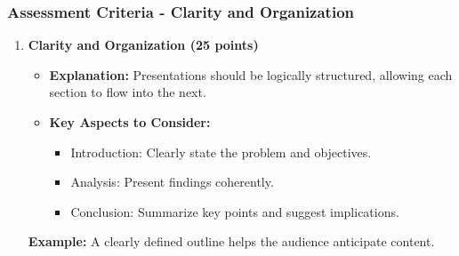\documentclass[aspectratio=169]{beamer}
\begin{document}
\begin{frame}[fragile]
    \frametitle{Assessment Criteria - Clarity and Organization}
    \begin{enumerate}
        \item \textbf{Clarity and Organization (25 points)}
        \begin{itemize}
            \item \textbf{Explanation:} Presentations should be logically structured, allowing each section to flow into the next.
            \item \textbf{Key Aspects to Consider:}
            \begin{itemize}
                \item Introduction: Clearly state the problem and objectives.
                \item Analysis: Present findings coherently.
                \item Conclusion: Summarize key points and suggest implications.
            \end{itemize}
        \end{itemize}
        
        \textbf{Example:} A clearly defined outline helps the audience anticipate content.
    \end{enumerate}
\end{frame}
\end{document}
